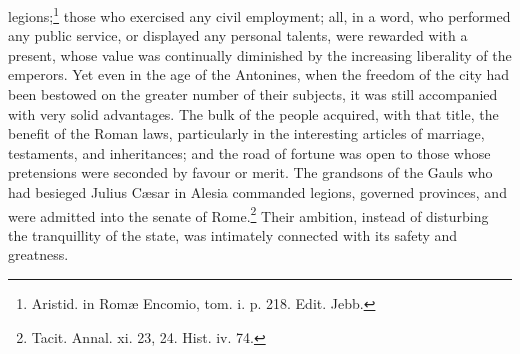 legions;\footnote{Aristid. in Romæ Encomio, tom. i. p. 218. Edit. Jebb.} those who exercised any civil employment; all, in a word, who performed any public service, or displayed any personal talents, were rewarded with a present, whose value was continually diminished by the increasing liberality of the emperors. Yet even in the age of the Antonines, when the freedom of the city had been bestowed on the greater number of their subjects, it was still accompanied with very solid advantages. The bulk of the people acquired, with that title, the benefit of the Roman laws, particularly in the interesting articles of marriage, testaments, and inheritances; and the road of fortune was open to those whose pretensions were seconded by favour or merit. The grandsons of the Gauls who had besieged Julius Cæsar in Alesia commanded legions, governed provinces, and were admitted into the senate of Rome.\footnote{Tacit. Annal. xi. 23, 24. Hist. iv. 74.} Their ambition, instead of disturbing the tranquillity of the state, was intimately connected with its safety and greatness.

